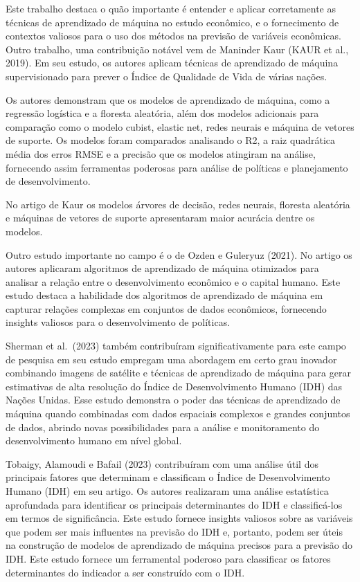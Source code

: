 \documentclass[
]{article}
\begin{document}
Este trabalho destaca o quão importante é entender e aplicar
corretamente as técnicas de aprendizado de máquina no estudo econômico,
e o fornecimento de contextos valiosos para o uso dos métodos na
previsão de variáveis econômicas. Outro trabalho, uma contribuição
notável vem de Maninder Kaur (KAUR et al., 2019). Em seu estudo, os
autores aplicam técnicas de aprendizado de máquina supervisionado para
prever o Índice de Qualidade de Vida de várias nações.

Os autores demonstram que os modelos de aprendizado de máquina, como a
regressão logística e a floresta aleatória, além dos modelos adicionais
para comparação como o modelo cubist, elastic net, redes neurais e
máquina de vetores de suporte. Os modelos foram comparados analisando o
R2, a raiz quadrática média dos erros RMSE e a precisão que os modelos
atingiram na análise, fornecendo assim ferramentas poderosas para
análise de políticas e planejamento de desenvolvimento.

No artigo de Kaur os modelos árvores de decisão, redes neurais, floresta
aleatória e máquinas de vetores de suporte apresentaram maior acurácia
dentre os modelos.

Outro estudo importante no campo é o de Ozden e Guleryuz (2021). No
artigo os autores aplicaram algoritmos de aprendizado de máquina
otimizados para analisar a relação entre o desenvolvimento econômico e o
capital humano. Este estudo destaca a habilidade dos algoritmos de
aprendizado de máquina em capturar relações complexas em conjuntos de
dados econômicos, fornecendo insights valiosos para o desenvolvimento de
políticas.

Sherman et al.~(2023) também contribuíram significativamente para este
campo de pesquisa em seu estudo empregam uma abordagem em certo grau
inovador combinando imagens de satélite e técnicas de aprendizado de
máquina para gerar estimativas de alta resolução do Índice de
Desenvolvimento Humano (IDH) das Nações Unidas. Esse estudo demonstra o
poder das técnicas de aprendizado de máquina quando combinadas com dados
espaciais complexos e grandes conjuntos de dados, abrindo novas
possibilidades para a análise e monitoramento do desenvolvimento humano
em nível global.

Tobaigy, Alamoudi e Bafail (2023) contribuíram com uma análise útil dos
principais fatores que determinam e classificam o Índice de
Desenvolvimento Humano (IDH) em seu artigo. Os autores realizaram uma
análise estatística aprofundada para identificar os principais
determinantes do IDH e classificá-los em termos de significância. Este
estudo fornece insights valiosos sobre as variáveis que podem ser mais
influentes na previsão do IDH e, portanto, podem ser úteis na construção
de modelos de aprendizado de máquina precisos para a previsão do IDH.
Este estudo fornece um ferramental poderoso para classificar os fatores
determinantes do indicador a ser construído com o IDH.
\end{document}
